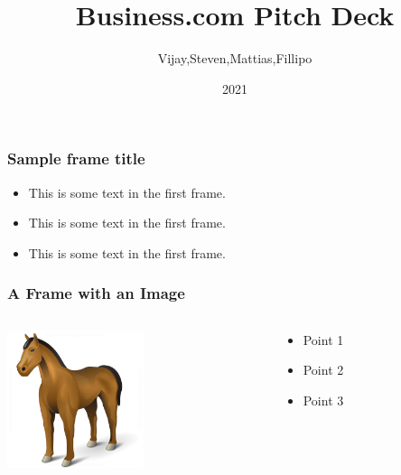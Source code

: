 \documentclass{beamer}
\title{Business.com Pitch Deck}
\author{Vijay,Steven,Mattias,Fillipo}
\institute{Overleaf}
\date{2021}
\begin{document}
\frame{\titlepage}

\begin{frame}
\frametitle{Sample frame title}
\begin{itemize}
  \item This is some text in the first frame.
  \item This is some text in the first frame.
  \item This is some text in the first frame.
\end{itemize}
\end{frame}


\begin{frame}
\frametitle{A Frame with an Image}
\begin{columns}

\begin{column}{0.5\textwidth}
  \centering
    \includegraphics[width=4cm]{HorseIcon.png}
\end{column}

\begin{column}{0.5\textwidth}
\begin{itemize}
  \item Point 1
  \item Point 2
  \item Point 3
\end{itemize}
\end{column}

\end{columns}

\end{frame}

\end{document}
